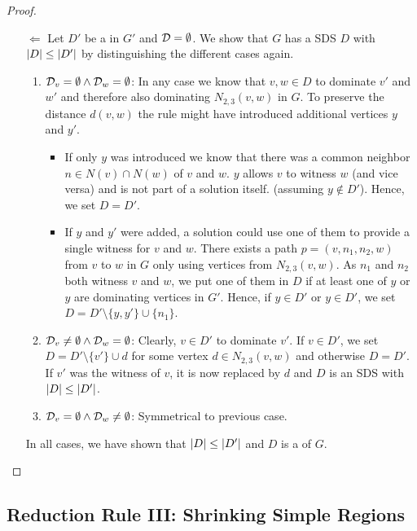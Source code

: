 \begin{proof}
\begin{enumerate}
        \item[$\Leftarrow$] Let $D'$ be a \sdom in $G'$ and $\mathcal{D} =  \emptyset$. We show that $G$ has a SDS $D$ with $\abs{D} \leq \abs{D'}$ by distinguishing the different cases again. 
        \begin{enumerate}
            \item  $\mathcal{D}_{v} = \emptyset \wedge \mathcal{D}_{w} = \emptyset$: In any case we know that $v,w \in D$ to dominate $v'$ and $w'$ and therefore also dominating $N_{2,3}(v,w)$ in $G$. To preserve the distance $d(v,w)$ the rule might have introduced additional vertices $y$ and $y'$.            
            \begin{itemize}
                \item If only $y$ was introduced we know that there was a common neighbor $n \in N(v) \cap N(w)$ of $v$ and $w$. $y$ allows $v$ to witness $w$ (and vice versa) and is not part of a solution itself. (assuming $y \notin D'$). Hence, we set $D = D'$.
                \item If $y$ and $y'$ were added, a solution could use one of them to provide a single witness for $v$ and $w$. There exists a path $p = (v, n_1, n_2, w)$ from $v$ to $w$ in $G$ only using vertices from $N_{2,3}(v,w)$. As $n_1$ and $n_2$ both witness $v$ and $w$, we put one of them in $D$ if at least one of $y$ or $y$ are dominating vertices in $G'$.
                Hence, if $y \in D'$ or $y \in D'$, we set $D = D' \setminus \{y,y'\} \cup \{n_1\}$.
            \end{itemize}
            \item  $\mathcal{D}_{v} \neq \emptyset \wedge \mathcal{D}_{w} = \emptyset$: Clearly, $v \in D'$ to dominate $v'$. If $v \in D'$, we set $D =  D' \setminus \{v'\} \cup d$ for some vertex $d \in N_{2,3}(v,w)$ and otherwise $D = D'$. If $v'$ was the witness of $v$, it is now replaced by $d$ and $D$ is an SDS with $\abs{D} \leq \abs{D'}$.
            \item  $\mathcal{D}_{v} = \emptyset \wedge \mathcal{D}_{w} \neq \emptyset$: Symmetrical to previous case.
        \end{enumerate} 
        In all cases, we have shown that $\abs{D} \leq \abs{D'}$ and $D$ is a \sdom of $G$.
    \end{enumerate}

\end{proof}
\subsection{Reduction Rule III: Shrinking Simple Regions}

